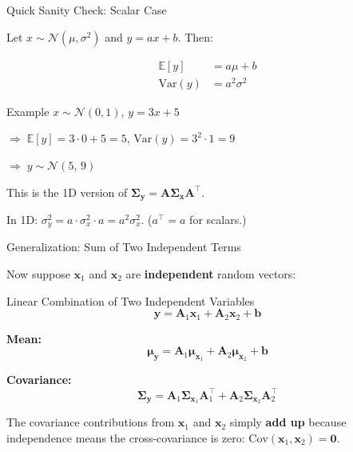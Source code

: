 \documentclass[aspectratio=169, 11pt]{beamer}
\newcommand{\E}{\mathbb{E}}
\newcommand{\Var}{\mathrm{Var}}
\newcommand{\Cov}{\mathrm{Cov}}
\newcommand{\T}{^{\top}}
\begin{document}
\begin{frame}{Quick Sanity Check: Scalar Case}

Let $x \sim \mathcal{N}(\mu, \sigma^2)$ and $y = ax + b$. Then:

\begin{align*}
  \E[y] &= a\mu + b \\[4pt]
  \Var(y) &= a^2 \sigma^2
\end{align*}

\vspace{6pt}

\begin{exampleblock}{Example}
$x \sim \mathcal{N}(0, 1)$, \quad $y = 3x + 5$

\vspace{4pt}
$\Rightarrow\; \E[y] = 3 \cdot 0 + 5 = 5$, \quad $\Var(y) = 3^2 \cdot 1 = 9$

\vspace{4pt}
$\Rightarrow\; y \sim \mathcal{N}(5,\, 9)$
\end{exampleblock}

\vspace{6pt}

This is the 1D version of $\bm{\Sigma}_{\mathbf{y}} = \mathbf{A}\bm{\Sigma}_{\mathbf{x}}\mathbf{A}\T$.

\vspace{2pt}
In 1D: $\sigma_y^2 = a \cdot \sigma_x^2 \cdot a = a^2 \sigma_x^2$. \; ($a\T = a$ for scalars.)

\end{frame}

\begin{frame}{Generalization: Sum of Two Independent Terms}

Now suppose $\mathbf{x}_1$ and $\mathbf{x}_2$ are \textbf{independent} random vectors:

\begin{block}{Linear Combination of Two Independent Variables}
$$\mathbf{y} = \mathbf{A}_1 \mathbf{x}_1 + \mathbf{A}_2 \mathbf{x}_2 + \mathbf{b}$$
\end{block}

\vspace{4pt}

\textbf{Mean:}
$$\bm{\mu}_{\mathbf{y}} = \mathbf{A}_1 \bm{\mu}_{\mathbf{x}_1} + \mathbf{A}_2 \bm{\mu}_{\mathbf{x}_2} + \mathbf{b}$$

\vspace{4pt}

\textbf{Covariance:}
$$\boxed{\bm{\Sigma}_{\mathbf{y}}
  = \mathbf{A}_1 \bm{\Sigma}_{\mathbf{x}_1} \mathbf{A}_1\T
  + \mathbf{A}_2 \bm{\Sigma}_{\mathbf{x}_2} \mathbf{A}_2\T}$$

\vspace{8pt}
The covariance contributions from $\mathbf{x}_1$ and $\mathbf{x}_2$ simply \textbf{add up}
because independence means the cross-covariance is zero:
$\Cov(\mathbf{x}_1, \mathbf{x}_2) = \mathbf{0}$.

\end{frame}
\end{document}
